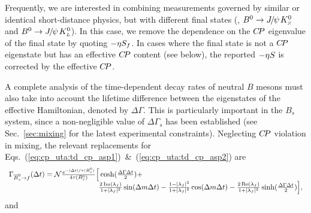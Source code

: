 Frequently, we are interested in combining measurements 
governed by similar or identical short-distance physics,
but with different final states
(\eg, $B^0 \to {J\mskip -3mu/\mskip -2mu\psi\mskip 2mu} K^0_{\scriptscriptstyle S}$ and $B^0 \to {J\mskip -3mu/\mskip -2mu\psi\mskip 2mu} K^0_{\scriptscriptstyle L}$).
In this case, we remove the dependence on the $C\!P$ eigenvalue 
of the final state by quoting $-{\eta} S_f$.
In cases where the final state is not a $C\!P$ eigenstate but has
an effective $C\!P$ content (see below),
the reported $-{\eta} S$ is corrected by the effective $C\!P$.

\label{sec:cp_uta:notations:Bs}

A complete analysis of the time-dependent decay rates of 
neutral $B$ mesons must also take into account the lifetime difference
between the eigenstates of the effective Hamiltonian, 
denoted by $\Delta \Gamma$.
This is particularly important in the $B_s$ system,
since a non-negligible value of $\Delta \Gamma_s$ has been established
(see Sec.~\ref{sec:mixing} for the latest experimental constraints).
Neglecting $C\!P$ violation in mixing,
the relevant replacements for 
Eqs.~(\ref{eq:cp_uta:td_cp_asp1})~\&~(\ref{eq:cp_uta:td_cp_asp2}) 
are~\cite{Dunietz:2000cr}
\begin{equation}
  \label{eq:cp_uta:td_cp_bs_asp1}
  \begin{array}{lcr}
    \mc{2}{l}{
      \Gamma_{\Bsbar \to f} (\Delta t) = 
      {\cal N} %
      \frac{e^{-| \Delta t | / \tau(\Bs)}}{4\tau(\Bs)}
      \Big[ 
      \cosh(\frac{\Delta \Gamma \Delta t}{2}) +
    } & \hspace{40mm} \\
    \hspace{40mm} &
    \mc{2}{r}{
      \frac{2\, \Im(\lambda_f)}{1 + |\lambda_f|^2} \sin(\Delta m \Delta t) -
      \frac{1 - |\lambda_f|^2}{1 + |\lambda_f|^2} \cos(\Delta m \Delta t) -
      \frac{2\, \Re(\lambda_f)}{1 + |\lambda_f|^2} \sinh(\frac{\Delta \Gamma \Delta t}{2})
      \Big],
    } \\
  \end{array}
\end{equation}
and
